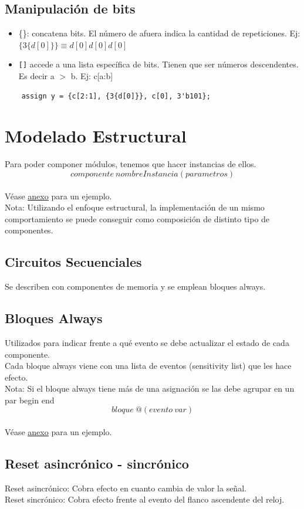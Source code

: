 \documentclass[10pt,a4paper]{article}
\begin{document}
\subsection*{Manipulación de bits}
\begin{itemize}
    \item \{\}: concatena bits. El número de afuera indica la cantidad de repeticiones. Ej: $ \{3\{d[0]\}\} \equiv d[0]d[0]d[0] $  
    \item \texttt{[]} accede a una lista específica de bits. Tienen que ser números descendentes. Es decir a $>$ b. Ej: c[a:b]
\end{itemize}
\begin{lstlisting}
    assign y = {c[2:1], {3{d[0]}}, c[0], 3'b101};
\end{lstlisting}
\section*{Modelado Estructural}
Para poder componer módulos, tenemos que hacer instancias de ellos. 
\[componente \ nombreInstancia(parametros)\] \\ 
Véase \hyperref[subsec:SVL_comp]{\underline{anexo}} para un ejemplo. \\
Nota: Utilizando el enfoque estructural, la implementación de un mismo comportamiento se puede conseguir como composición de distinto tipo de componentes. 
\subsection*{Circuitos Secuenciales}
Se describen con componentes de memoria y se emplean bloques always.
\subsection*{Bloques Always}
\label{subsec:bloques_always}
Utilizados para indicar frente a qué evento se debe actualizar el estado de cada componente. \\ 
Cada bloque always viene con una lista de eventos (sensitivity list) que les hace efecto.  \\
Nota: Si el bloque always tiene más de una asignación se las debe agrupar en un par begin end \\
\[bloque \ @(evento \ var)\] \\ 
Véase \hyperref[subsec:SVL_bloques_clk]{\underline{anexo}} para un ejemplo. 
\subsection*{Reset asincrónico - sincrónico}
\label{subsec:reset_sincronico_asincronico}
Reset asincrónico: Cobra efecto en cuanto cambia de valor la señal. \\ 
Reset sincrónico: Cobra efecto frente al evento del flanco ascendente del reloj.
\end{document}
